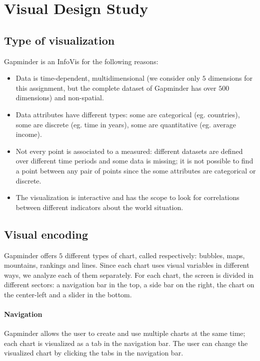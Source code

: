 \section{Visual Design Study}
\label{sec:visual_design}

\subsection{Type of visualization}
Gapminder is an InfoVis for the following reasons:
\begin{itemize}
    \item Data is time-dependent, multidimensional (we consider only $5$ dimensions for this assignment, but the complete dataset of Gapminder has over $500$ dimensions) and non-spatial.
    \item Data attributes have different types: some are categorical (eg. countries), some are discrete (eg. time in years), some are quantitative (eg. average income). 
    \item Not every point is associated to a measured: different datasets are defined over different time periods and some data is missing; it is not possible to find a point between any pair of points since the some attributes are categorical or discrete.
    \item The visualization is interactive and has the scope to look for correlations between different indicators about the world situation.
\end{itemize}


\subsection{Visual encoding}
Gapminder offers $5$ different types of chart, called respectively: bubbles, maps, mountains, rankings and lines.
Since each chart uses visual variables in different ways, we analyze each of them separately.
For each chart, the screen is divided in different sectors:
a navigation bar in the top, a side bar on the right, the chart on the center-left and a slider in the bottom.

\paragraph{Navigation}
Gapminder allows the user to create and use multiple charts at the same time;
each chart is visualized as a tab in the navigation bar.
The user can change the visualized chart by clicking the tabs in the navigation bar.

